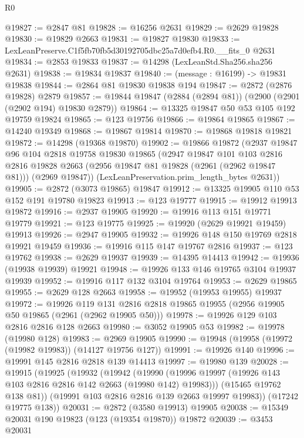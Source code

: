 \begin{lexlean}{R0}
\begin{coremodule}
@19827 := @2847 @81
@19828 := @16256 @2631
@19829 := @2629 @19828
@19830 := @19829 @2663
@19831 := @19827 @19830
@19833 := LexLeanPreserve.C1f5fb70fb5d30192705dbc25a7d0efb4.R0.__fits_0 @2631
@19834 := @2853 @19833
@19837 := @14298 (LexLeanStd.Sha256.sha256 @2631)
@19838 := @19834 @19837
@19840 := (message : @16199) -> @19831 @19838
@19844 := @2864 @81 @19830 @19838 @194
@19847 := @2872 (@2876 @19828) @2879
@19857 := @19844 @19847 (@2884 (@2894 @81)) (@2900 (@2901 (@2902 @194) @19830 @2879))
@19864 := @13325 @19847 @50 @53 @105 @192 @19759 @19824
@19865 := @123 @19756
@19866 := @19864 @19865
@19867 := @14240 @19349
@19868 := @19867 @19814
@19870 := @19868 @19818 @19821
@19872 := @14298 (@19368 @19870)
@19902 := @19866
    @19872
    (@2937
      @19847
      @96
      @104
      @2818
      @19758
      @19830
      @19865
      (@2947
        @19847
        @101
        @103
        @2816
        @2816
        @19828
        @2663
        (@2956 @19847 @81 @19828 (@2961 (@2962 @19847 @81)))
        (@2969 @19847))
      (LexLeanPreservation.prim_length_bytes @2631))
@19905 := @2872 (@3073 @19865) @19847
@19912 := @13325 @19905 @110 @53 @152 @191 @19780 @19823
@19913 := @123 @19777
@19915 := @19912 @19913 @19872
@19916 := @2937 @19905
@19920 := @19916 @113 @151 @19771 @19779
@19921 := @123 @19775
@19925 := @19920 (@2629 @19921 @19459) @19913
@19926 := @2947 @19905
@19932 := @19926 @148 @150 @19769 @2818 @19921 @19459
@19936 := @19916 @115 @147 @19767 @2816
@19937 := @123 @19762
@19938 := @2629 @19937
@19939 := @14395 @14413
@19942 := @19936 (@19938 @19939) @19921
@19948 := @19926 @133 @146 @19765 @3104 @19937 @19939
@19952 := @19916 @117 @132 @3104 @19764
@19953 := @2629 @19865
@19955 := @2629 @128 @2663
@19958 := @19952 (@19953 @19955) @19937
@19972 := @19926
    @119
    @131
    @2816
    @2818
    @19865
    @19955
    (@2956 @19905 @50 @19865 (@2961 (@2962 @19905 @50)))
@19978 := @19926 @129 @103 @2816 @2816 @128 @2663
@19980 := @3052 @19905 @53
@19982 := @19978 (@19980 @128)
@19983 := @2969 @19905
@19990 := @19948 (@19958 (@19972 (@19982 @19983)) (@14127 @19756 @127))
@19991 := @19926 @140
@19996 := @19991 @145 @2816 @2818 @139 @14413
@19997 := @19980 @139
@20028 := @19915
    (@19925
      (@19932
        (@19942
          (@19990 (@19996 @19997 (@19926 @143 @103 @2816 @2816 @142 @2663 (@19980 @142) @19983)))
          (@15465 @19762 @138 @81))
        (@19991 @103 @2816 @2816 @139 @2663 @19997 @19983))
      (@17242 @19775 @138))
@20031 := @2872 (@3580 @19913) @19905
@20038 := @15349 @20031 @190 @19823 (@123 (@19354 @19870)) @19872
@20039 := @3453 @20031

\end{coremodule}
\end{lexlean}
